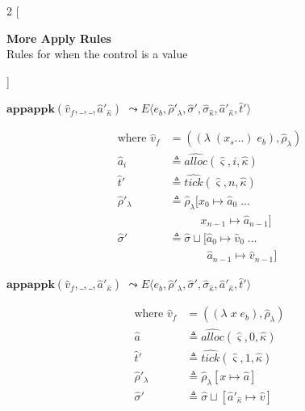 \documentclass[12pt,draft]{article}
\newcommand{\lamsyn}[2]{(\lambda\;(#1 ...)\;#2)}
\newcommand{\vararglamsyn}[2]{(\lambda\;#1\;#2)}
\begin{document}
\begin{multicols*}{2}
[
\begin{center}
\textbf{More Apply Rules} \\
Rules for when the control is a value
\end{center}
]
\begin{center}
  $\textbf{appappk}(\hat{v}_f, \_, \_, \hat{a}'_{\hat{\kappa}})$
  $\leadsto E\langle e_b , \hat{\rho}'_{\lambda} , \hat{\sigma}' ,
  \hat{\sigma}_{\hat{\kappa}} , \hat{a}'_{\hat{\kappa}} , \hat{t}'\rangle$
\end{center}
\vspace{-7mm}
\begin{align*}
  \text{where } \hat{v}_f &= (\lamsyn{x_s}{e_b}, \hat{\rho}_{\lambda}) \\
  \hat{a}_i &\triangleq \widehat{alloc}(\hat{\varsigma}, i, \hat{\kappa}) \\
  \hat{t}' &\triangleq \widehat{tick}(\hat{\varsigma}, n, \hat{\kappa}) \\
  \hat{\rho}'_{\lambda} &\triangleq \hat{\rho}_{\lambda}[x_0 \mapsto \hat{a}_0\; ... \\
                          &\;\;\;\;\;\;\;\;\;\;x_{n-1} \mapsto \hat{a}_{n-1}] \\
  \hat{\sigma}' &\triangleq \hat{\sigma} \sqcup [\hat{a}_0 \mapsto \hat{v}_0\;... \\
  &\;\;\;\;\;\;\;\;\;\;\;\;\hat{a}_{n-1} \mapsto \hat{v}_{n-1}]
\end{align*}
\begin{center}
  $\textbf{appappk}(\hat{v}_f, \_, \_, \hat{a}'_{\hat{\kappa}})$
  $\leadsto E\langle e_b , \hat{\rho}'_\lambda , \hat{\sigma}' , \hat{\sigma}_{\hat{\kappa}} , \hat{a}'_{\hat{\kappa}} , \hat{t}'\rangle$
\end{center}
\vspace{-7mm}
\begin{align*}
  \text{where } \hat{v}_f &= (\vararglamsyn{x}{e_b}, \hat{\rho}_{\lambda}) \\
  \hat{a} &\triangleq \widehat{alloc}(\hat{\varsigma}, 0, \hat{\kappa}) \\
  \hat{t}' &\triangleq \widehat{tick}(\hat{\varsigma}, 1, \hat{\kappa}) \\
  \hat{\rho}'_{\lambda} &\triangleq \hat{\rho}_{\lambda}[x \mapsto \hat{a}] \\
  \hat{\sigma}' &\triangleq \hat{\sigma} \sqcup [\hat{a}'_{\hat{\kappa}} \mapsto \hat{v}]

\end{align*}
\end{multicols*}
\end{document}
